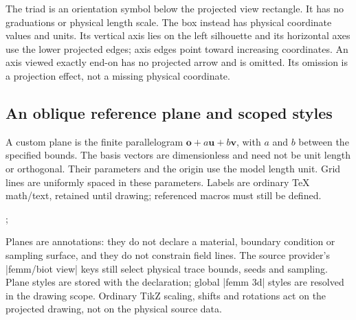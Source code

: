 The triad is an orientation symbol below the projected view rectangle. It has no
graduations or physical length scale. The box instead has physical coordinate
values and units. Its vertical axis lies on the left silhouette and its horizontal axes use the lower projected edges; axis edges
point toward increasing coordinates. An axis viewed exactly end-on has no
projected arrow and is omitted. Its omission is a projection effect, not a
missing physical coordinate.

\subsection{An oblique reference plane and scoped styles}
A custom plane is the finite parallelogram
$\boldsymbol o+a\boldsymbol u+b\boldsymbol v$, with $a$ and $b$ between the
specified bounds. The basis vectors are dimensionless and need not be unit
length or orthogonal. Their parameters and the origin use the model length
unit. Grid lines are uniformly spaced in these parameters. Labels are ordinary
TeX math/text, retained until drawing; referenced macros must still be defined.
\begin{codeexample}[width=0pt]
\begingroup
\tikzpicture[femm/biot,
 femm/biot view={seeds={.3/0/0;-.3/0/0},
 step=.15,maximum length=8}]
 \femmbiotsource[current=2]
 \femmbiotscene[name=oblique-loop]
\endtikzpicture
\femmviewplane[scene=oblique-loop,plane=custom,
 origin=0/0/-.4,u=1/0/0,v=0/1/.5,
 umin=-1.3,umax=1.3,vmin=-1.3,vmax=1.3,
 grid=both,step=.5,subdivisions=2,label={$P$},
 style={fill=green!30,draw=green!40!black}]
\tikzpicture[femm/view 3d={scene=oblique-loop,
 axes=origin,ticks=none,coordinate scale=.8,
 xmin=-2,xmax=2,ymin=-2,ymax=2,zmin=-2,zmax=2},
 femm 3d field/.append style={red!60!blue},
 femm 3d axis label/.append style={text=black!65}]
 ;
\endtikzpicture
{}
\endgroup
\end{codeexample}

Planes are annotations: they do not declare a material, boundary condition or
sampling surface, and they do not constrain field lines. The source provider's
|femm/biot view| keys still select physical trace bounds, seeds and sampling.
Plane styles are stored with the declaration; global |femm 3d| styles are
resolved in the drawing scope. Ordinary TikZ scaling, shifts and rotations act
on the projected drawing, not on the physical source data.

